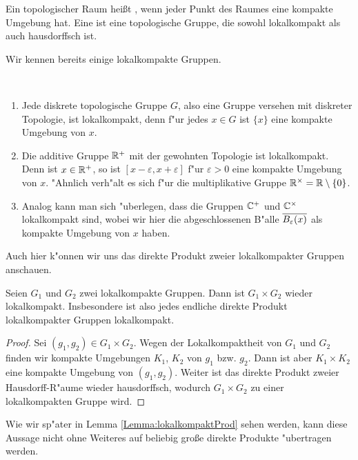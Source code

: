 	
	\begin{defi}
		Ein topologischer Raum heißt , wenn jeder Punkt des Raumes eine kompakte Umgebung hat. 
		Eine  ist eine topologische Gruppe, die sowohl lokalkompakt als auch hausdorffsch ist. 
	\end{defi}
	Wir kennen bereits einige lokalkompakte Gruppen.
	\begin{bsp}~ 
		\begin{enumerate}[label=(\roman*)]
			\item Jede diskrete topologische Gruppe $G$, also eine Gruppe versehen mit diskreter Topologie, ist lokalkompakt, denn f"ur jedes $x \in G$ ist $\{x\}$ eine kompakte Umgebung von $x$.
			\item Die additive Gruppe $\mathbb{R}^+$ mit der gewohnten Topologie ist lokalkompakt. Denn ist $x\in\mathbb{R}^+$, so ist $[x-\varepsilon, x+\varepsilon]$ f"ur $\varepsilon>0$ eine kompakte Umgebung von $x$. "Ahnlich verh"alt es sich f"ur die multiplikative Gruppe $\mathbb{R}^\times = \mathbb{R} \setminus\{0\}$.
			\item Analog kann man sich "uberlegen, dass die Gruppen $\mathbb{C}^+$ und $\mathbb{C}^\times$ lokalkompakt sind, wobei wir hier die abgeschlossenen B"alle $\overline{B_\varepsilon(x)}$ als kompakte Umgebung von $x$ haben.
		\end{enumerate}
	\end{bsp}
	Auch hier k"onnen wir uns das direkte Produkt zweier lokalkompakter Gruppen anschauen. 
	\begin{lemma}\label{satz:topo:lcaproduct}
		Seien $G_1$ und $G_2$ zwei lokalkompakte Gruppen. 
		Dann ist $G_1\times G_2$ wieder lokalkompakt. 
		Insbesondere ist also jedes endliche direkte Produkt lokalkompakter Gruppen lokalkompakt.
	\end{lemma}
	\begin{proof}
		Sei $(g_1,g_2) \in G_1\times G_2$. Wegen der Lokalkompaktheit von $G_1$ und $G_2$ finden wir kompakte Umgebungen $K_1$, $K_2$ von $g_1$ bzw. $g_2$. Dann ist aber $K_1 \times K_2$ eine kompakte Umgebung von $(g_1,g_2)$. 
		Weiter ist das direkte Produkt zweier Hausdorff-R"aume wieder hausdorffsch, wodurch $G_1\times G_2$ zu einer lokalkompakten Gruppe wird.
	\end{proof}
	Wie wir sp"ater in Lemma \ref{Lemma:lokalkompaktProd} sehen werden, kann diese Aussage nicht ohne Weiteres auf beliebig gro\ss e direkte Produkte "ubertragen werden.

